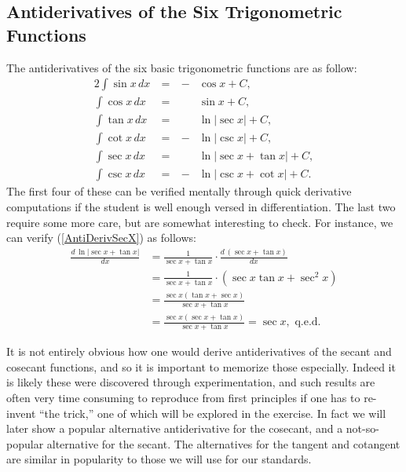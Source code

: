 \subsection{Antiderivatives of the Six Trigonometric Functions}
The antiderivatives of the six basic trigonometric functions
are as follow:
\begin{alignat}{2}
\int\sin x\,dx&\ =\ &-&\cos x+C,\label{AntiDerivSinX}\\
\int\cos x\,dx&\ =\ &&\sin x+C,\label{AntiDerivCosX}\\
\int\tan x\,dx&\ =\ &&\ln|\sec x|+C,\label{AntiDerivTanX}\\
\int\cot x\,dx&\ =\ &-&\ln|\csc x|+C,\label{AntiDerivCotX}\\
\int\sec x\,dx&\ =\ &&\ln|\sec x+\tan x|+C,\label{AntiDerivSecX}\\
\int\csc x\,dx&\ =\ &-&\ln|\csc x+\cot x|+C.\label{AntiDerivCscX}
\end{alignat}
The first four of these can be verified mentally through quick derivative
computations if the student is well enough versed in differentiation.
The last two require some more care, but are somewhat interesting to check.
For instance, we can verify (\ref{AntiDerivSecX}) as 
follows:
\begin{align*}
\frac{d\,\ln|\sec x+\tan x|}{dx}
&=\frac1{\sec x+\tan x}\cdot\frac{d\,(\sec x+\tan x)}{dx}\\
&=\frac1{\sec x+\tan x}\cdot(\sec x\tan x+\sec^2x)\\
&=\frac{\sec x(\tan x+\sec x)}{\sec x+\tan x}\\
&=\frac{\sec x(\sec x+\tan x)}{\sec x+\tan x}=\sec x,\text{ q.e.d.}
\end{align*}\label{ProofOfIntegralOfSecant}


It is not entirely obvious how one would derive antiderivatives of 
the secant and cosecant functions, and so it is important to memorize
those especially. Indeed it is likely these were discovered through
experimentation, and such results are often very time consuming
to reproduce from first principles if one has to re-invent ``the trick,''
one of which will be explored in the exercise.
In fact we will later show a popular alternative antiderivative
for the cosecant, and a not-so-popular alternative for the secant.
The alternatives for the tangent and cotangent are similar in
popularity to those we will use for our standards.

